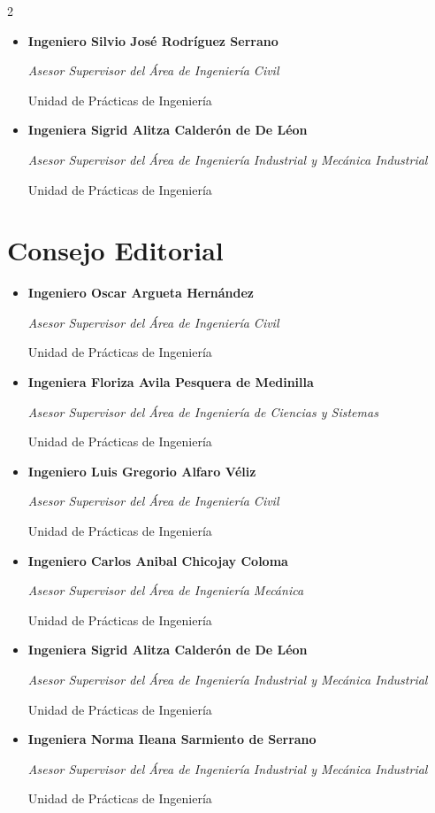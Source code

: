 \documentclass[12pt,spanish,Letterpaper,openany]{book}
\begin{document}
\begin {multicols}{2}
\begin{itemize}
  \emph{Asesor Supervisor del Área de Ingeniería Civil}

  Unidad de Prácticas de Ingeniería
\item
  \textbf{Ingeniero Silvio José Rodríguez Serrano}

  \emph{Asesor Supervisor del Área de Ingeniería Civil}

  Unidad de Prácticas de Ingeniería
\item
  \textbf{Ingeniera Sigrid Alitza Calderón de De Léon}

  \emph{Asesor Supervisor del Área de Ingeniería Industrial y Mecánica Industrial}

  Unidad de Prácticas de Ingeniería
\end{itemize}

\hypertarget{consejo-editorial}{%
\section*{Consejo Editorial}\label{consejo-editorial}}

\begin{itemize}
\item
  \textbf{Ingeniero Oscar Argueta Hernández}

  \emph{Asesor Supervisor del Área de Ingeniería Civil}

  Unidad de Prácticas de Ingeniería
\item
  \textbf{Ingeniera Floriza Avila Pesquera de Medinilla}

  \emph{Asesor Supervisor del Área de Ingeniería de Ciencias y Sistemas}

  Unidad de Prácticas de Ingeniería
\item
  \textbf{Ingeniero Luis Gregorio Alfaro Véliz}

  \emph{Asesor Supervisor del Área de Ingeniería Civil}

  Unidad de Prácticas de Ingeniería
\item
  \textbf{Ingeniero Carlos Anibal Chicojay Coloma}

  \emph{Asesor Supervisor del Área de Ingeniería Mecánica}

  Unidad de Prácticas de Ingeniería
\item
  \textbf{Ingeniera Sigrid Alitza Calderón de De Léon}

  \emph{Asesor Supervisor del Área de Ingeniería Industrial y Mecánica Industrial}

  Unidad de Prácticas de Ingeniería
\item
  \textbf{Ingeniera Norma Ileana Sarmiento de Serrano}

  \emph{Asesor Supervisor del Área de Ingeniería Industrial y Mecánica Industrial}

  Unidad de Prácticas de Ingeniería
\end{itemize}

\end {multicols}
\end{document}
